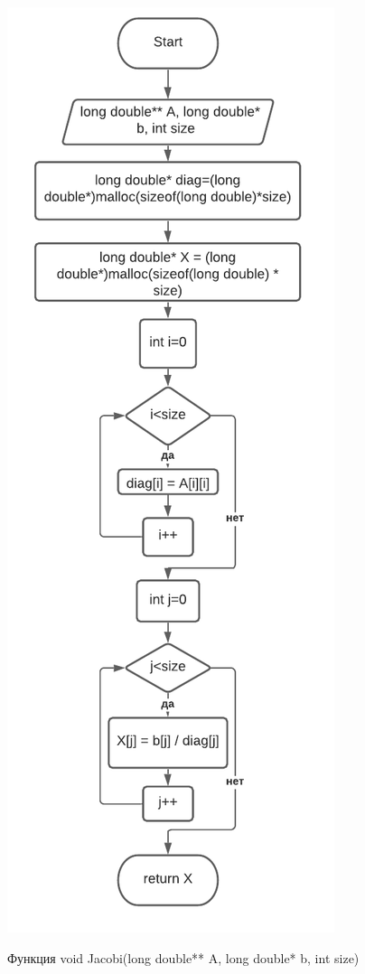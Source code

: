 \includegraphics[scale=0.5]{block5.pdf}

Функция void Jacobi(long double** A, long double* b, int size)

